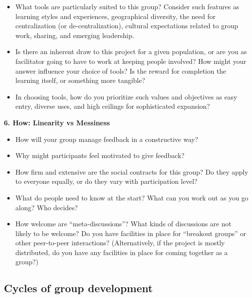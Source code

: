\begin{itemize}
\itemsep1pt\parskip0pt
\item
  What tools are particularly suited to this group? Consider such
  features as learning styles and experiences, geographical diversity,
  the need for centralization (or de-centralization), cultural
  expectations related to group work, sharing, and emerging leadership.
\item
  Is there an inherent draw to this project for a given population, or
  are you as facilitator going to have to work at keeping people
  involved? How might your answer influence your choice of tools? Is the
  reward for completion the learning itself, or something more tangible?
\item
  In choosing tools, how do you prioritize such values and objectives as
  easy entry, diverse uses, and high ceilings for sophisticated
  expansion?
\end{itemize}

\textbf{6. How: Linearity vs Messiness}

\begin{itemize}
\itemsep1pt\parskip0pt
\item
  How will your group manage feedback in a constructive way?
\item
  Why might participants feel motivated to give feedback?
\item
  How firm and extensive are the social contracts for this group? Do
  they apply to everyone equally, or do they vary with participation
  level?
\item
  What do people need to know at the start? What can you work out as you
  go along? Who decides?
\item
  How welcome are ``meta-discussions''? What kinds of discussions are
  not likely to be welcome? Do you have facilities in place for
  ``breakout groups'' or other peer-to-peer interactions?
  (Alternatively, if the project is mostly distributed, do you have any
  facilities in place for coming together as a group?)
\end{itemize}

\subsection{Cycles of group
development}\label{cycles-of-group-development}

